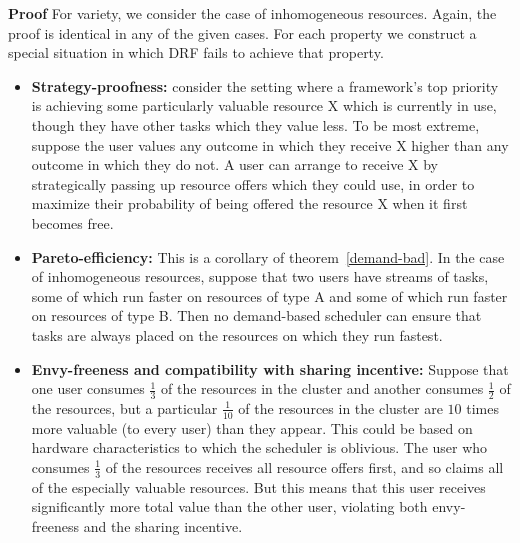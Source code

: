 \documentclass{acm_proc_article-sp}
\begin{document}
\textbf{Proof} For variety, we consider the case of inhomogeneous resources. Again, the proof is identical in any of the given cases. For each property we construct a special situation in which DRF fails to achieve that property.
\vspace{-5mm}
\begin{itemize}
\itemsep0em
\item \textbf{Strategy-proofness:} consider the setting where a framework's top priority is achieving some particularly valuable resource X 
which is currently in use, though they have other tasks which they value less. To be most extreme, suppose the user values any outcome in which they receive X 
higher than any outcome in which they do not. 
A user can arrange to receive X by strategically passing up resource offers which they could use, in order to maximize 
their probability of being offered the resource X when it first becomes free. 
\item \textbf{Pareto-efficiency:} This is a corollary of theorem~\ref{demand-bad}. 
In the case of inhomogeneous resources, suppose that two users have streams of tasks, some of which run faster on resources of type A and some of which run faster on resources of type B. 
Then no demand-based scheduler can ensure that tasks are always placed on the resources on which they run fastest.
\item \textbf{Envy-freeness and compatibility with sharing incentive:} Suppose that one user consumes $\frac 13$ of the resources in the cluster and another consumes $\frac 12$ of the resources, 
but a particular $\frac 1{10}$ of the resources in the cluster are $10$ times more valuable (to every user) than they appear. 
This could be based on hardware characteristics to which the scheduler is oblivious. 
The user who consumes $\frac 13$ of the resources receives all resource offers first, and so claims all of the especially valuable resources. 
But this means that this user receives significantly more total value than the other user, violating both envy-freeness and the sharing incentive. 
\end{itemize}
\end{document}
